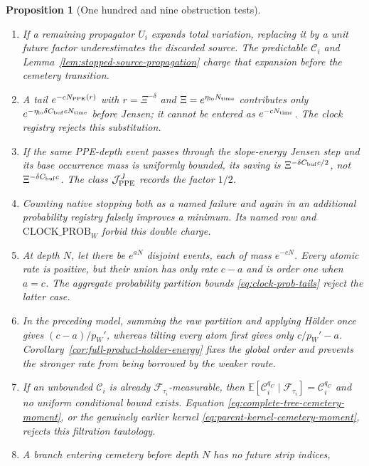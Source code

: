 \documentclass[11pt]{article}
\newtheorem{proposition}[theorem]{Proposition}
\begin{document}
\begin{proposition}[One hundred and nine obstruction tests]
\begin{enumerate}[label=\textup{(T\arabic*)}]
      mass $e^{-qN}$.  Its probability tail has rate $q$, but its current
      has only rate $q-a$.  Equation \eqref{eq:cemetery-kernel-domination}
      rejects the missing envelope.
\item If a remaining propagator $U_i$ expands total variation, replacing it
      by a unit future factor underestimates the discarded source.  The
      predictable $\mathcal C_i$ and
      Lemma~\ref{lem:stopped-source-propagation} charge that expansion before
      the cemetery transition.
\item A tail $e^{-cN_{\rm PPE}(r)}$ with $r=\Xi^{-\delta}$ and
      $\Xi=e^{\eta_{\rm lo}N_{\rm time}}$ contributes only
      $e^{-\eta_{\rm lo}\delta C_{\rm buf}cN_{\rm time}}$ before Jensen; it
      cannot be entered as $e^{-cN_{\rm time}}$.  The clock registry rejects
      this substitution.
\item If the same PPE-depth event passes through the slope-energy Jensen
      step and its base occurrence mass is uniformly bounded, its saving is
      $\Xi^{-\delta C_{\rm buf}c/2}$, not
      $\Xi^{-\delta C_{\rm buf}c}$.  The class
      $\mathcal J_{\rm PPE}^{J}$ records the factor $1/2$.
\item Counting native stopping both as a named failure and again in an
      additional probability registry falsely improves a minimum.  Its
      named row and \(\mathrm{CLOCK\_PROB}_{W}\) forbid this double charge.
\item At depth $N$, let there be $e^{aN}$ disjoint events, each of mass
      $e^{-cN}$.  Every atomic rate is positive, but their union has only
      rate $c-a$ and is order one when $a=c$.  The aggregate probability
      partition bounds \eqref{eq:clock-prob-tails} reject the latter case.
\item In the preceding model, summing the raw partition and applying
      H\"older once gives $(c-a)/p_W'$, whereas tilting every atom first gives
      only $c/p_W'-a$.  Corollary~\ref{cor:full-product-holder-energy}
      fixes the global order and prevents the stronger rate from being
      borrowed by the weaker route.
\item If an unbounded $\mathcal C_i$ is already
      $\mathcal F_{\tau_i}$-measurable, then
      $\mathbb E[\mathcal C_i^{q_C}\mid\mathcal F_{\tau_i}]
      =\mathcal C_i^{q_C}$ and no uniform conditional bound exists.
      Equation \eqref{eq:complete-tree-cemetery-moment}, or the genuinely
      earlier kernel \eqref{eq:parent-kernel-cemetery-moment}, rejects this
      filtration tautology.
\item A branch entering cemetery before depth $N$ has no future strip indices,

\end{enumerate}
\end{proposition}
\end{document}
